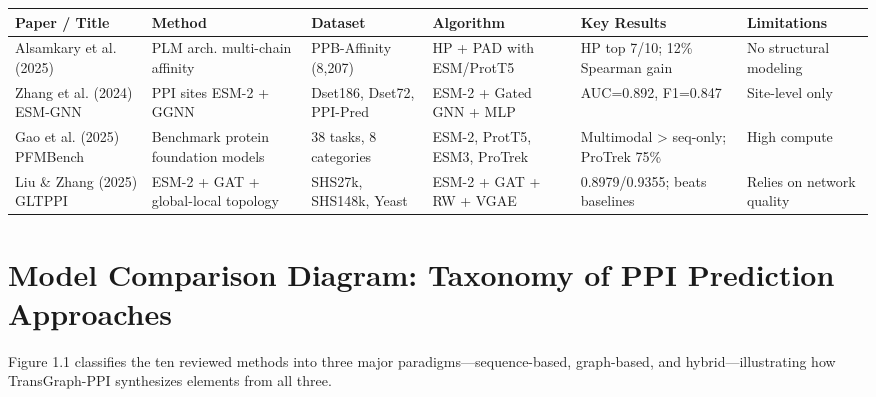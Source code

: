 \documentclass[12pt,a4paper]{report}
\begin{document}
\newpage

\begin{landscape}
\begin{table}[H]
\centering
\small
\begin{tabular}{|p{}|p{}|p{}|p{}|p{}|p{}|}
\hline
\textbf{Paper / Title} & \textbf{Method} & \textbf{Dataset} & \textbf{Algorithm} & \textbf{Key Results} & \textbf{Limitations} \\ \hline
Alsamkary et al. (2025) & PLM arch. multi-chain affinity & PPB-Affinity (8,207) & HP + PAD with ESM/ProtT5 & HP top 7/10; 12\% Spearman gain & No structural modeling \\ \hline
Zhang et al. (2024) ESM-GNN & PPI sites ESM-2 + GGNN & Dset186, Dset72, PPI-Pred & ESM-2 + Gated GNN + MLP & AUC=0.892, F1=0.847 & Site-level only \\ \hline
Gao et al. (2025) PFMBench & Benchmark protein foundation models & 38 tasks, 8 categories & ESM-2, ProtT5, ESM3, ProTrek & Multimodal > seq-only; ProTrek 75\% & High compute \\ \hline
Liu \& Zhang (2025) GLTPPI & ESM-2 + GAT + global-local topology & SHS27k, SHS148k, Yeast & ESM-2 + GAT + RW + VGAE & 0.8979/0.9355; beats baselines & Relies on network quality \\ \hline
\end{tabular}
\end{table}
\end{landscape}

\newpage

\section{Model Comparison Diagram: Taxonomy of PPI Prediction Approaches}
Figure 1.1 classifies the ten reviewed methods into three major paradigms---sequence-based, graph-based, and hybrid---illustrating how TransGraph-PPI synthesizes elements from all three.
\end{document}
